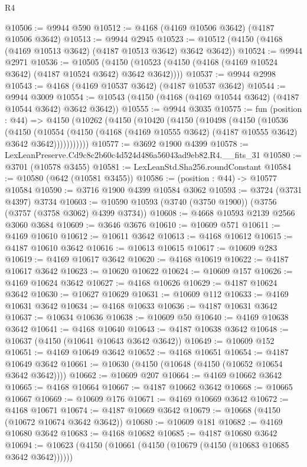 \begin{lexlean}{R4}
\begin{coremodule}
@10506 := @9944 @590
@10512 := @4168 (@4169 @10506 @3642) (@4187 @10506 @3642)
@10513 := @9944 @2945
@10523 := @10512 (@4150 (@4168 (@4169 @10513 @3642) (@4187 @10513 @3642) @3642 @3642))
@10524 := @9944 @2971
@10536 := @10505
    (@4150 (@10523 (@4150 (@4168 (@4169 @10524 @3642) (@4187 @10524 @3642) @3642 @3642))))
@10537 := @9944 @2998
@10543 := @4168 (@4169 @10537 @3642) (@4187 @10537 @3642)
@10544 := @9944 @3009
@10554 := @10543 (@4150 (@4168 (@4169 @10544 @3642) (@4187 @10544 @3642) @3642 @3642))
@10555 := @9944 @3035
@10575 := fun (position : @44) =>
  @4150
    (@10262
      (@4150
        (@10420
          (@4150
            (@10498
              (@4150
                (@10536
                  (@4150
                    (@10554
                      (@4150 (@4168 (@4169 @10555 @3642) (@4187 @10555 @3642) @3642 @3642)))))))))))
@10577 := @3692 @1900 @4399
@10578 := LexLeanPreserve.Cd9c8c2b60c4d524d486a56043ad9eb82.R4.__fits_31
@10580 := @3701 (@10578 @3455)
@10581 := LexLeanStd.Sha256.roundConstant
@10584 := @10580 (@642 (@10581 @3455))
@10586 := (position : @44) -> @10577 @10584
@10590 := @3716 @1900 @4399 @10584 @3062
@10593 := @3724 (@3731 @4397) @3734
@10603 := @10590 @10593 (@3740 (@3750 @1900)) (@3756 (@3757 (@3758 @3062) @4399 @3734))
@10608 := @4668 @10593 @2139 @2566 @3060 @3684
@10609 := @3646 @3676
@10610 := @10609 @571
@10611 := @4169 @10610
@10612 := @10611 @3642
@10613 := @4168 @10612
@10615 := @4187 @10610 @3642
@10616 := @10613 @10615
@10617 := @10609 @283
@10619 := @4169 @10617 @3642
@10620 := @4168 @10619
@10622 := @4187 @10617 @3642
@10623 := @10620 @10622
@10624 := @10609 @157
@10626 := @4169 @10624 @3642
@10627 := @4168 @10626
@10629 := @4187 @10624 @3642
@10630 := @10627 @10629
@10631 := @10609 @112
@10633 := @4169 @10631 @3642
@10634 := @4168 @10633
@10636 := @4187 @10631 @3642
@10637 := @10634 @10636
@10638 := @10609 @50
@10640 := @4169 @10638 @3642
@10641 := @4168 @10640
@10643 := @4187 @10638 @3642
@10648 := @10637 (@4150 (@10641 @10643 @3642 @3642))
@10649 := @10609 @152
@10651 := @4169 @10649 @3642
@10652 := @4168 @10651
@10654 := @4187 @10649 @3642
@10661 := @10630 (@4150 (@10648 (@4150 (@10652 @10654 @3642 @3642))))
@10662 := @10609 @207
@10664 := @4169 @10662 @3642
@10665 := @4168 @10664
@10667 := @4187 @10662 @3642
@10668 := @10665 @10667
@10669 := @10609 @176
@10671 := @4169 @10669 @3642
@10672 := @4168 @10671
@10674 := @4187 @10669 @3642
@10679 := @10668 (@4150 (@10672 @10674 @3642 @3642))
@10680 := @10609 @181
@10682 := @4169 @10680 @3642
@10683 := @4168 @10682
@10685 := @4187 @10680 @3642
@10694 := @10623 (@4150 (@10661 (@4150 (@10679 (@4150 (@10683 @10685 @3642 @3642))))))

\end{coremodule}
\end{lexlean}
